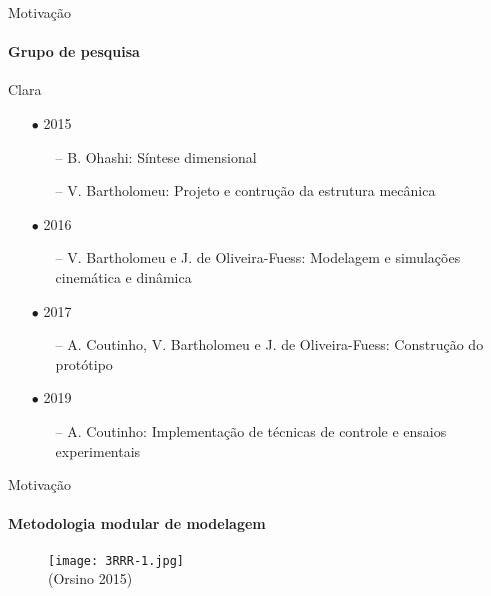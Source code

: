 \documentclass[25pt,landscape]{beamer}
\begin{document}
\begin{frame}{Motiva\c{c}\~ao}
	\framesubtitle{Grupo de pesquisa}
	\begin{block}{Clara}
		\begin{itemize}
			\item[$\bullet$] 2015
			\begin{itemize}
				\item[--] B. Ohashi: Síntese dimensional \\[4pt]
				\item[--] V. Bartholomeu: Projeto e contru\c{c}\~ao da estrutura mec\^anica \\[4pt]
			\end{itemize}
			\item[$\bullet$] 2016
			\begin{itemize}
				\item[--] V. Bartholomeu e J. de Oliveira-Fuess: Modelagem e simula\c{c}\~oes cinem\'atica e din\^amica \\[4pt]
			\end{itemize}
			\item[$\bullet$] 2017
			\begin{itemize}
				\item[--] A. Coutinho, V. Bartholomeu e J. de Oliveira-Fuess: Constru\c{c}\~ao do prot\'otipo \\[4pt]
			\end{itemize}
			\item[$\bullet$] 2019
			\begin{itemize}
				\item[--] A. Coutinho: Implementa\c{c}\~ao de t\'ecnicas de controle e ensaios experimentais \\[4pt]
			\end{itemize}
		\end{itemize}
	\end{block}
\end{frame}

\begin{frame}{Motiva\c{c}\~ao}
    \framesubtitle{Metodologia modular de modelagem}
    \pause
    \begin{figure}[!h]
        \centering
        \texttt{[image: 3RRR-1.jpg]} \\
        (Orsino 2015)
    \end{figure}  
\end{frame}
\end{document}
